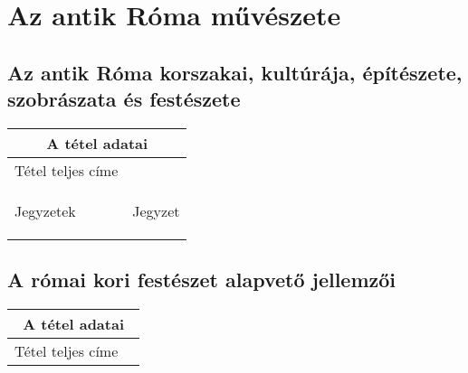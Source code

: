 \chapter{Az antik Róma művészete} %
\label{ch:3_antik_roma}

\section{Az antik Róma korszakai, kultúrája, építészete, szobrászata és festészete}

\begin{center}
	\begin{longtable}{ | p{} | p{} | }
		
		\hline
		\multicolumn{2}{|c|}{\textbf{A tétel adatai}}
		\\ \hline
		
		\hline
		Tétel teljes címe & 
		\\ \hline
		
		Jegyzetek &
		\begin{compactitem}
			\item Jegyzet
		\end{compactitem}
		\\\hline
		
	\end{longtable}
\end{center}


\section{A római kori festészet alapvető jellemzői}

\begin{center}
	\begin{longtable}{ | p{} | p{} | }
		
		\hline
		\multicolumn{2}{|c|}{\textbf{A tétel adatai}}
		\\ \hline
		
		\hline
		Tétel teljes címe 
		&
		
		\\ \hline
		
	\end{longtable}
\end{center}